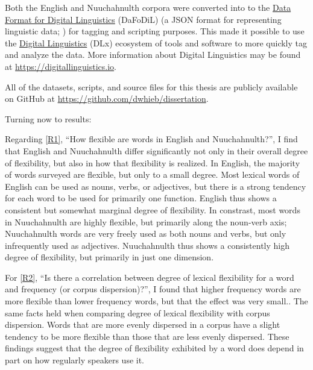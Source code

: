 Both the English and Nuuchahnulth corpora were converted into to the \href{https://format.digitallinguistics.io}{Data Format for Digital Linguistics} (DaFoDiL) (a JSON format for representing linguistic data; ) for tagging and scripting purposes. This made it possible to use the \href{https://digitallinguistics.io}{Digital Linguistics} (DLx) ecosystem of tools and software to more quickly tag and analyze the data. More information about Digital Linguistics may be found at \url{https://digitallinguistics.io}.

All of the datasets, scripts, and source files for this thesis are publicly available on GitHub at \url{https://github.com/dwhieb/dissertation}.

Turning now to results:

Regarding \ref{R1}, \enquote{How flexible are words in English and Nuuchahnulth?}, I find that English and Nuuchahnulth differ significantly not only in their overall degree of flexibility, but also in how that flexibility is realized. In English, the majority of words surveyed are flexible, but only to a small degree. Most lexical words of English can be used as nouns, verbs, or adjectives, but there is a strong tendency for each word to be used for primarily one function. English thus shows a consistent but somewhat marginal degree of flexibility. In constrast, most words in Nuuchahnulth are highly flexible, but primarily along the noun-verb axis; Nuuchahnulth words are very freely used as both nouns and verbs, but only infrequently used as adjectives. Nuuchahnulth thus shows a consistently high degree of flexibility, but primarily in just one dimension.

For \ref{R2}, \enquote{Is there a correlation between degree of lexical flexibility for a word and frequency (or corpus dispersion)?}, I found that higher frequency words are more flexible than lower frequency words, but that the effect was very small.. The same facts held when comparing degree of lexical flexibility with corpus dispersion. Words that are more evenly dispersed in a corpus have a slight tendency to be more flexible than those that are less evenly dispersed. These findings suggest that the degree of flexibility exhibited by a word does depend in part on how regularly speakers use it.

